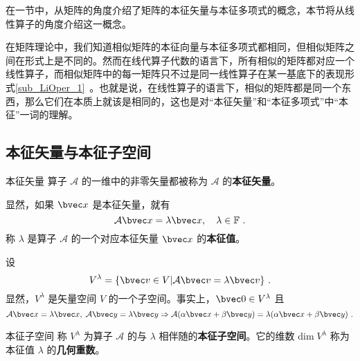 
在一节中，从矩阵的角度介绍了矩阵的本征矢量与本征多项式的概念，本节将从线性算子的角度介绍这一概念。

在矩阵理论中，我们知道相似矩阵的本征向量与本征多项式都相同，但相似矩阵之间在形式上是不同的。然而在线代算子代数的语言下，所有相似的矩阵都对应一个线性算子，而相似矩阵中的每一矩阵只不过是同一线性算子在某一基底下的表现形式\autoref{sub_LiOper_1}~。也就是说，在线性算子的语言下，相似的矩阵都是同一个东西，那么它们在本质上就该是相同的，这也是对“本征矢量”和“本征多项式”中“本征”一词的理解。

\subsection{本征矢量与本征子空间}
\begin{definition}{本征矢量}
算子 $\mathcal{A}$ 的一维中的非零矢量都被称为 $\mathcal{A}$ 的\textbf{本征矢量}。
\end{definition}
显然，如果 $\bvec x$ 是本征矢量，就有
\begin{equation}\label{eq_EigVM_1}
\mathcal{A}\bvec x=\lambda \bvec x,\quad \lambda\in\mathbb{F}~.
\end{equation}
称 $\lambda$ 是算子 $\mathcal{A}$ 的一个对应本征矢量 $\bvec x$ 的\textbf{本征值}。

设
\begin{equation}
V^{\lambda}=\{\bvec v\in V|\mathcal{A}\bvec v=\lambda \bvec v\}~.
\end{equation}
显然，$V^{\lambda}$ 是矢量空间 $V$ 的一个子空间。事实上，$\bvec 0\in V^{\lambda}$ 且
\begin{equation}
\mathcal{A}\bvec x=\lambda \bvec x,\;\mathcal{A}\bvec y=\lambda \bvec y\Rightarrow\mathcal{A}(\alpha\bvec x+\beta\bvec y)=\lambda(\alpha\bvec x+\beta \bvec y)~.
\end{equation}
\begin{definition}{本征子空间}\label{def_EigVM_1}
称 $V^{\lambda}$ 为算子 $\mathcal{A}$ 的与 $\lambda$ 相伴随的\textbf{本征子空间}。它的维数 $\mathrm{dim}\;V^{\lambda}$ 称为本征值 $\lambda$ 的\textbf{几何重数}。 
\end{definition}
